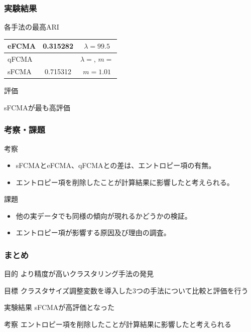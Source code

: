 \documentclass[13pt,dvipdfmx]{beamer}
\begin{document}
\begin{frame}\frametitle{実験結果}
  \begin{block}{各手法の最高ARI}
    \vspace{5mm}
    \begin{table}[htb]
      \begin{tabular}{ l || c | c }\hline
        eFCMA & 0.315282 & $\lambda = 99.5$\\ \hline  
        qFCMA &  & $\lambda = $\;, \;$m = $\\  \hline
        sFCMA & 0.715312 & $m = 1.01$\\ \hline
      \end{tabular}
    \end{table}
  \end{block}
  \begin{block}{評価}
    \begin{center}
      sFCMAが最も高評価
    \end{center}
  \end{block}
\end{frame}

\begin{frame}\frametitle{考察・課題}
  \begin{block}{考察}
    \begin{itemize}
    \item sFCMAとeFCMA、qFCMAとの差は、エントロピー項の有無。
    \item エントロピー項を削除したことが計算結果に影響したと考えられる。
    \end{itemize}
  \end{block}
  \begin{block}{課題}
    \begin{itemize}
    \item 他の実データでも同様の傾向が現れるかどうかの検証。
    \item エントロピー項が影響する原因及び理由の調査。
    \end{itemize}
  \end{block}
\end{frame}

\begin{frame}\frametitle{まとめ}
  \begin{block}{目的}
   より精度が高いクラスタリング手法の発見
  \end{block}
  \vspace{4mm}
  \begin{block}{目標}
   クラスタサイズ調整変数を導入した3つの手法について比較と評価を行う
  \end{block}
  \begin{block}{実験結果}
   sFCMAが高評価となった
  \end{block}
  \begin{block}{考察}
   エントロピー項を削除したことが計算結果に影響したと考えられる
  \end{block}
\end{frame}
\end{document}
